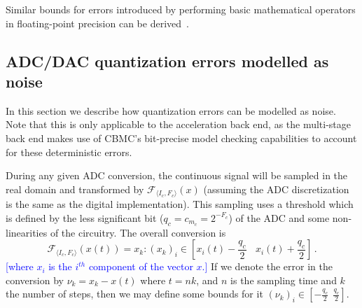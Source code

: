 \documentclass[twocolumn]{autart}    %
\newcommand{\reply}[1]{\textcolor{blue}{[#1]}}
\begin{document}
Similar bounds for errors introduced by 
performing basic mathematical operators in floating-point precision can be derived~\cite{DBLP:conf/arith/BrainTRW15}.


\subsection{ADC/DAC quantization errors modelled as noise} 
In this section we describe how quantization errors can be modelled as noise. 
Note that this is only applicable to the acceleration back end, as the multi-stage back 
end makes use of CBMC's bit-precise model checking capabilities to account 
for these deterministic errors.

During any given ADC conversion, the continuous signal will be sampled in
the real domain and transformed by $\mathcal{F}_{\langle I_{c},F_{c} \rangle}
(x)$ (assuming the ADC discretization is the same as the digital
implementation).  This sampling uses a threshold which is defined by the
less significant bit ($q_{c}=c_{m_c}=2^{-F_c}$) 
of the ADC and some non-linearities of the circuitry.  The overall conversion is
%
$$\mathcal{F}_{\langle I_{c},F_{c} \rangle}(x(t)) = x_k :
(x_k)_i \in \left[x_i(t)-\frac{q_{c}}{2}\ \ \ \ x_i(t)+\frac{q_{c}}{2}\right] \,.$$
%
\reply{where $x_i$ is the $i^{th}$ component of the vector $x$.}
If we denote the error in the conversion by $\nu_k=x_k-x(t)$ where $t = nk$,
and $n$ is the sampling time and $k$ the number of steps, then we may define
some bounds for it $(\nu_k)_i \in [-\frac{q_{c}}{2}\ \ \frac{q_{c}}{2}]$.
\end{document}
